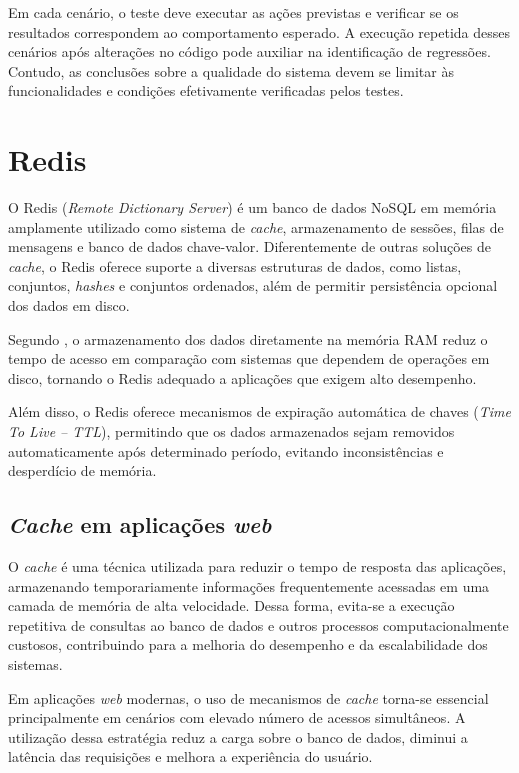 Em cada cenário, o teste deve executar as ações previstas e verificar se os resultados correspondem ao comportamento esperado. A execução repetida desses cenários após alterações no código pode auxiliar na identificação de regressões. Contudo, as conclusões sobre a qualidade do sistema devem se limitar às funcionalidades e condições efetivamente verificadas pelos testes.



\section{Redis}

O Redis (\textit{Remote Dictionary Server}) é um banco de dados NoSQL em memória amplamente utilizado como sistema de \textit{cache}, armazenamento de sessões, filas de mensagens e banco de dados chave-valor. Diferentemente de outras soluções de \textit{cache}, o Redis oferece suporte a diversas estruturas de dados, como listas, conjuntos, \textit{hashes} e conjuntos ordenados, além de permitir persistência opcional dos dados em disco.

Segundo , o armazenamento dos dados diretamente na memória RAM reduz o tempo de acesso em comparação com sistemas que dependem de operações em disco, tornando o Redis adequado a aplicações que exigem alto desempenho.

Além disso, o Redis oferece mecanismos de expiração automática de chaves (\textit{Time To Live -- TTL}), permitindo que os dados armazenados sejam removidos automaticamente após determinado período, evitando inconsistências e desperdício de memória.

\subsection{\textit{Cache} em aplicações \textit{web}}

O \textit{cache} é uma técnica utilizada para reduzir o tempo de resposta das aplicações, armazenando temporariamente informações frequentemente acessadas em uma camada de memória de alta velocidade. Dessa forma, evita-se a execução repetitiva de consultas ao banco de dados e outros processos computacionalmente custosos, contribuindo para a melhoria do desempenho e da escalabilidade dos sistemas.

Em aplicações \textit{web} modernas, o uso de mecanismos de \textit{cache} torna-se essencial principalmente em cenários com elevado número de acessos simultâneos. A utilização dessa estratégia reduz a carga sobre o banco de dados, diminui a latência das requisições e melhora a experiência do usuário.



